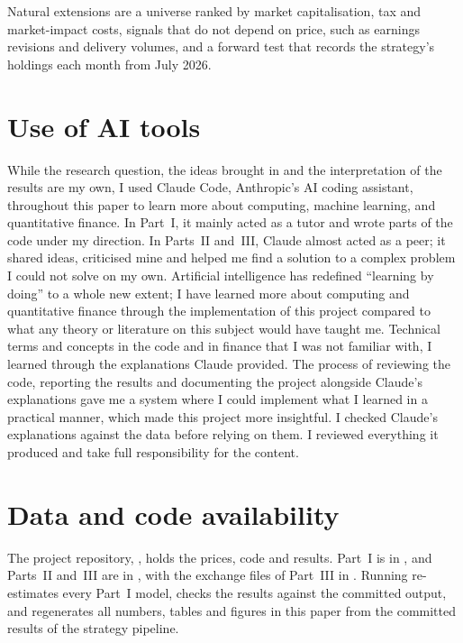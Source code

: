 \documentclass[11pt]{article}
\begin{document}
Natural extensions are a universe ranked by market capitalisation, tax and
market-impact costs, signals that do not depend on price, such as earnings revisions
and delivery volumes, and a forward test that records the strategy's holdings each
month from July 2026.

\section*{Use of AI tools}

While the research question, the ideas brought in and the interpretation of the
results are my own, I used Claude Code, Anthropic's AI coding assistant, throughout this paper to learn more about computing, machine learning, and quantitative finance. 
In Part~I, it mainly acted as a tutor and wrote parts of the code under my direction. In
Parts~II and~III, Claude almost acted as a peer; it shared ideas, criticised mine and helped me find a solution to a complex problem I could not solve on my own. 
Artificial intelligence has redefined ``learning by doing'' to a whole new extent; I have learned more about computing and quantitative finance through the implementation of this project
compared to what any theory or literature on this subject would have taught me. Technical terms and concepts in the code and in finance 
that I was not familiar with, I learned through the explanations Claude provided. The process of reviewing the code, reporting the results and documenting the project alongside Claude's explanations gave me a
system where I could implement what I learned in a practical manner, which made this project more insightful.
I checked Claude's explanations against the data before relying on them. I reviewed everything it
produced and take full responsibility for the content.

\section*{Data and code availability}

{\sloppy
The project repository,
,
holds the prices, code and results. Part~I is in , and Parts~II
and~III are in , with the exchange files of Part~III in
. Running 
re-estimates every Part~I model, checks the results against the committed output,
and regenerates all numbers, tables and figures in this paper from the committed
results of the strategy pipeline.\par}
\end{document}
